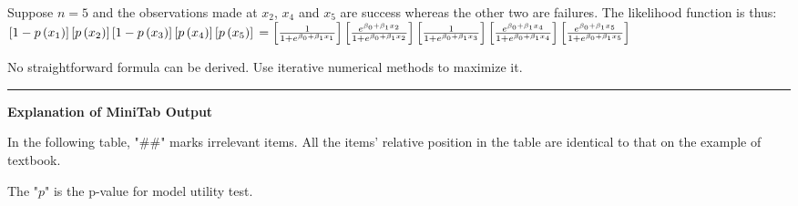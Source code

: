 \documentclass{article}
\newcommand{\sectionline}{\color{black}\rule[2pt]{0.45\textwidth}{0.05em}\color{black}}
\newcommand{\bigtitle}[1]{
	\noindent
	\textbf{#1}
}
\begin{document}
	Suppose $n=5$ and the observations made at $x_2$, $x_4$ and $x_5$ are success whereas the other two are failures. The likelihood function is thus:\\
	$\left[ 1 - p \left( x _ { 1 } \right) \right] \left[ p \left( x _ { 2 } \right) \right] \left[ 1 - p \left( x _ { 3 } \right) \right] \left[ p \left( x _ { 4 } \right) \right] \left[ p \left( x _ { 5 } \right) \right] \\= \left[ \frac { 1 } { 1 + e ^ { \beta _ { 0 } + \beta _ { 1 } x _ { 1 } } } \right] \left[ \frac { e ^ { \beta _ { 0 } + \beta _ { 1 } x _ { 2 } } } { 1 + e ^ { \beta _ { 0 } + \beta _ { 1 } x _ { 2 } } } \right] \left[ \frac { 1 } { 1 + e ^ { \beta _ { 0 } + \beta _ { 1 } x _ { 3 } } } \right] \left[ \frac { e ^ { \beta _ { 0 } + \beta _ { 1 } x _ { 4 } } } { 1 + e ^ { \beta _ { 0 } + \beta _ { 1 } x _ { 4 } } } \right] \left[ \frac { e ^ { \beta _ { 0 } + \beta _ { 1 } x _ { 5 } } } { 1 + e ^ { \beta _ { 0 } + \beta _ { 1 } x _ { 5 } } } \right]$
	
	No straightforward formula can be derived. Use iterative numerical methods to maximize it.
	
	
	\sectionline
	
	\bigtitle{Explanation of MiniTab Output}
	
	In the following table, "\#\#" marks irrelevant items. All the items' relative position in the table are identical to that on the example of textbook.
	
	The "$p$" is the p-value for model utility test.
	
\end{document}
